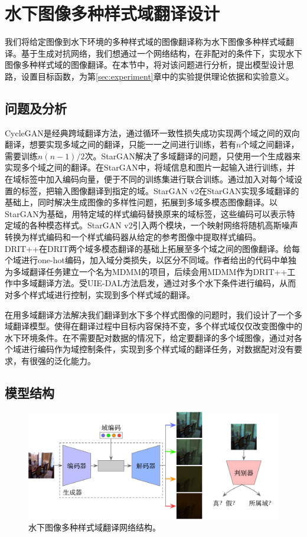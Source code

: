 \section{水下图像多种样式域翻译设计}
我们将给定图像到水下环境的多种样式域的图像翻译称为水下图像多种样式域翻译。基于生成对抗网络，我们想通过一个网络结构，在非配对的条件下，实现水下图像多种样式域的图像翻译。在本节中，将对该问题进行分析，提出模型设计思路，设置目标函数，为第\ref{sec:experiment}章中的实验提供理论依据和实验意义。

\subsection{问题及分析}

CycleGAN是经典跨域翻译方法，通过循环一致性损失成功实现两个域之间的双向翻译，想要实现多域之间的翻译，只能一一之间进行训练，若有$n$个域之间翻译，需要训练$n(n-1)/2$次。StarGAN解决了多域翻译的问题，只使用一个生成器来实现多个域之间的翻译。在StarGAN中，将域信息和图片一起输入进行训练，并在域标签中加入编码向量，便于不同的训练集进行联合训练。通过加入对每个域设置的标签，把输入图像翻译到指定的域。StarGAN v2在StarGAN实现多域翻译的基础上，同时解决生成图像的多样性问题，拓展到多域多模态图像翻译。以StarGAN为基础，用特定域的样式编码替换原来的域标签，这些编码可以表示特定域的各种模态样式。StarGAN v2引入两个模块，一个映射网络将随机高斯噪声转换为样式编码和一个样式编码器从给定的参考图像中提取样式编码。DRIT++在DRIT两个域多模态翻译的基础上拓展至多个域之间的图像翻译。给每个域进行one-hot编码，加入域分类损失，以区分不同域。作者给出的代码中单独为多域翻译任务建立一个名为MDMM的项目，后续会用MDMM作为DRIT++工作中多域翻译方法。受UIE-DAL方法启发，通过对多个水下条件进行编码，从而对多个样式域进行控制，实现到多个样式域的翻译。

在用多域翻译方法解决我们翻译到水下多个样式图像的问题时，我们设计了一个多域翻译模型。使得在翻译过程中目标内容保持不变，多个样式域仅仅改变图像中的水下环境条件。在不需要配对数据的情况下，给定要翻译的多个域图像，通过对各个域进行编码作为域控制条件，实现到多个样式域的翻译任务，对数据配对没有要求，有很强的泛化能力。

\subsection{模型结构}

\begin{figure}[ht]
    \centering
    \includegraphics[width=1\textwidth]{figures/Domain_network.pdf}
    \caption{水下图像多种样式域翻译网络结构。}
    \label{fig:domain_net}
\end{figure}

